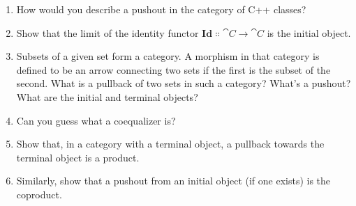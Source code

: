 \begin{enumerate}
\tightlist
\item
  How would you describe a pushout in the category of C++ classes?
\item
  Show that the limit of the identity functor
  $\mathbf{Id} \Colon \cat{C} \to \cat{C}$ is the initial object.
\item
  Subsets of a given set form a category. A morphism in that category is
  defined to be an arrow connecting two sets if the first is the subset
  of the second. What is a pullback of two sets in such a category?
  What's a pushout? What are the initial and terminal objects?
\item
  Can you guess what a coequalizer is?
\item
  Show that, in a category with a terminal object, a pullback towards
  the terminal object is a product.
\item
  Similarly, show that a pushout from an initial object (if one exists)
  is the coproduct.
\end{enumerate}